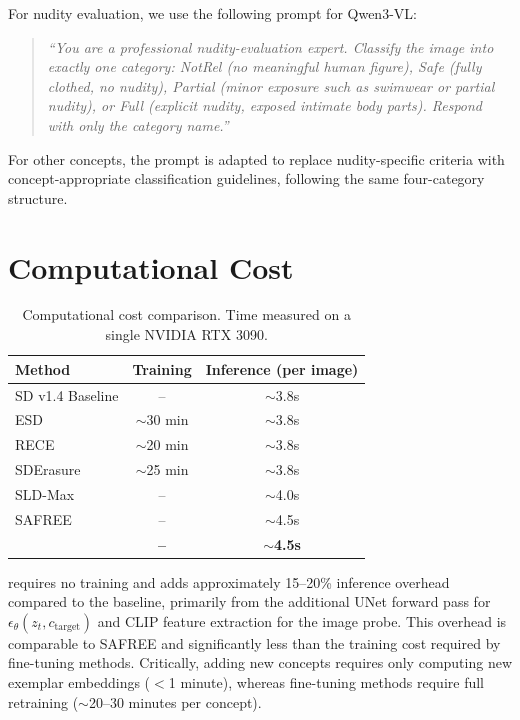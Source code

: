 For nudity evaluation, we use the following prompt for Qwen3-VL:

\begin{quote}
\small
\textit{``You are a professional nudity-evaluation expert. Classify the image into exactly one category: NotRel (no meaningful human figure), Safe (fully clothed, no nudity), Partial (minor exposure such as swimwear or partial nudity), or Full (explicit nudity, exposed intimate body parts). Respond with only the category name.''}
\end{quote}

For other concepts, the prompt is adapted to replace nudity-specific criteria with concept-appropriate classification guidelines, following the same four-category structure.

\section{Computational Cost}
\label{app:compute}

\begin{table}[h]
\centering
\caption{Computational cost comparison. Time measured on a single NVIDIA RTX 3090.}
\label{table:compute}
\small
\renewcommand{\arraystretch}{1.1}
\begin{tabular}{@{}lcc@{}}
\toprule
\textbf{Method} & \textbf{Training} & \textbf{Inference (per image)} \\
\midrule
SD v1.4 Baseline & -- & $\sim$3.8s \\
ESD & $\sim$30 min & $\sim$3.8s \\
RECE & $\sim$20 min & $\sim$3.8s \\
SDErasure & $\sim$25 min & $\sim$3.8s \\
\midrule
SLD-Max & -- & $\sim$4.0s \\
SAFREE & -- & $\sim$4.5s \\
\textbf{\ours{}} & \textbf{--} & $\sim$\textbf{4.5s} \\
\bottomrule
\end{tabular}
\end{table}

\ours{} requires no training and adds approximately 15--20\% inference overhead compared to the baseline, primarily from the additional UNet forward pass for $\epsilon_\theta(z_t, c_\text{target})$ and CLIP feature extraction for the image probe. This overhead is comparable to SAFREE and significantly less than the training cost required by fine-tuning methods. Critically, adding new concepts requires only computing new exemplar embeddings ($<$1 minute), whereas fine-tuning methods require full retraining ($\sim$20--30 minutes per concept).

